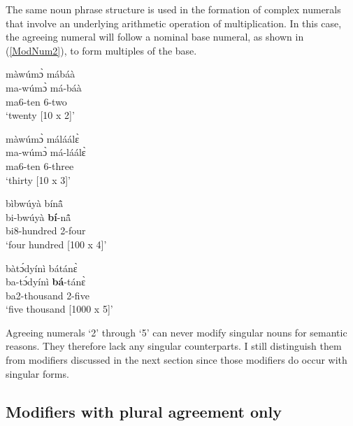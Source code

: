 The same noun phrase structure is used in the formation of complex numerals that involve an underlying arithmetic operation of multiplication. In this case, the agreeing numeral will follow a nominal base numeral, as shown in (\ref{ModNum2}), to form multiples of the base.

\begin {exe}
\ex\label {ModNum2}
\begin{xlist}
\parbox[t]{2in}{\ex \glll màwúmɔ̀ mábáà\\ 
ma-wúmɔ̀ má-báà\\
ma6-ten 6-two \\
 `twenty [10 x 2]'}
\parbox[t]{2in}{ \ex \glll màwúmɔ̀ máláálɛ̀ \\ 
ma-wúmɔ̀ má-láálɛ̀ \\
   ma6-ten 6-three \\
 `thirty [10 x 3]'}


\parbox[t]{2in}{ \ex \glll bìbwúyà bínã̂ \\
bi-bwúyà {\bfseries bí}-nã̂\\ 
bi8-hundred 2-four \\
`four hundred [100 x 4]'}
\parbox[t]{2in}{ \ex \glll bàtɔ́dyínì bátánɛ̀ \\ 
ba-tɔ́dyínì {\bfseries bá}-tánɛ̀ \\
   ba2-thousand 2-five \\
`five thousand [1000 x 5]'}
\end{xlist}
\end {exe}


Agreeing numerals `2' through `5' can never modify singular nouns for semantic reasons. They therefore lack any singular counterparts. I still distinguish them from modifiers discussed in the next section since those modifiers do occur with singular forms.






\subsection{Modifiers with plural agreement only}
\label{sec:MODAgrPL}


